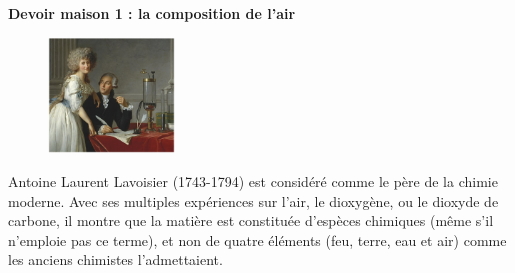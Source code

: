 \renewcommand{\thesubsection}{\textcolor{red}{\Roman{section}.\arabic{subsection}}}
\renewcommand{\thesubsubsection}{\textcolor{red}{\Roman{section}.\arabic{subsection}.\alph{subsubsection}}}

\setcounter{section}{0}
\setcounter{document}{0}
\sndEnTeteDMUn

\begin{center}
\begin{mdframed}[style=titr, leftmargin=60pt, rightmargin=60pt, innertopmargin=7pt, innerbottommargin=7pt, innerrightmargin=8pt, innerleftmargin=8pt]

\begin{center}
\large{\textbf{Devoir maison 1 : la composition de l'air}}
\end{center}

\end{mdframed}
\end{center}

\begin{figure}
\vspace{-1cm}
    \centering
      \includegraphics[width=0.3\textwidth]{Images/Activite/Chap1/Lavoisier.PNG}
  \end{figure}
Antoine Laurent Lavoisier (1743-1794) est considéré comme le père de la chimie moderne. Avec ses multiples expériences sur l’air, le dioxygène, ou le dioxyde de carbone, il montre que la matière est
constituée d’espèces chimiques (même s’il n’emploie pas ce terme), et non de quatre éléments (feu, terre, eau et air) comme les anciens chimistes
l’admettaient.\\
\newline

